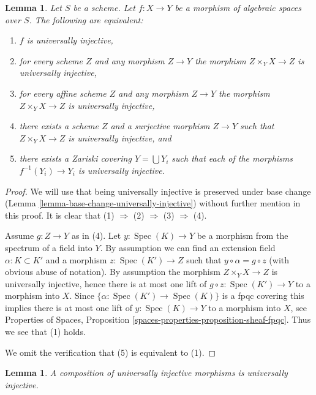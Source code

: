 \documentclass{stacks-project}
\theoremstyle{plain}
\newtheorem{lemma}[subsection]{Lemma}
\theoremstyle{definition}
\theoremstyle{remark}
\numberwithin{equation}{subsection}
\def\Spec{\mathop{\mathrm{Spec}}}
\begin{document}
\begin{lemma}
\label{lemma-universally-injective-local}
Let $S$ be a scheme.
Let $f : X \to Y$ be a morphism of algebraic spaces over $S$.
The following are equivalent:
\begin{enumerate}
\item $f$ is universally injective,
\item for every scheme $Z$ and any morphism $Z \to Y$ the morphism
$Z \times_Y X \to Z$ is universally injective,
\item for every affine scheme $Z$ and any morphism
$Z \to Y$ the morphism $Z \times_Y X \to Z$ is universally injective,
\item there exists a scheme $Z$ and a surjective morphism
$Z \to Y$ such that $Z \times_Y X \to Z$ is universally injective, and
\item there exists a Zariski covering $Y = \bigcup Y_i$ such that
each of the morphisms $f^{-1}(Y_i) \to Y_i$ is universally injective.
\end{enumerate}
\end{lemma}

\begin{proof}
We will use that being universally injective is preserved under base change
(Lemma \ref{lemma-base-change-universally-injective})
without further mention in this proof.
It is clear that (1) $\Rightarrow$ (2) $\Rightarrow$ (3)
$\Rightarrow$ (4).

\medskip\noindent
Assume $g : Z \to Y$ as in (4). Let $y : \Spec(K) \to Y$ be a
morphism from the spectrum of a field into $Y$. By assumption we
can find an extension field $\alpha : K \subset K'$ and a morphism
$z : \Spec(K') \to Z$ such that $y \circ \alpha = g \circ z$
(with obvious abuse of notation). By assumption the
morphism $Z \times_Y X \to Z$ is universally injective, hence there
is at most one
lift of $g \circ z : \Spec(K') \to Y$ to a morphism into $X$.
Since $\{\alpha : \Spec(K') \to \Spec(K)\}$ is a
fpqc covering this implies there is at most one lift of
$y : \Spec(K) \to Y$ to a morphism into $X$, see
Properties of Spaces, Proposition
\ref{spaces-properties-proposition-sheaf-fpqc}.
Thus we see that (1) holds.

\medskip\noindent
We omit the verification that (5) is equivalent to (1).
\end{proof}

\begin{lemma}
\label{lemma-composition-universally-injective}
A composition of universally injective morphisms is universally injective.
\end{lemma}
\end{document}
